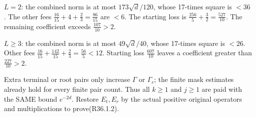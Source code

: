 \(L=2\): the combined norm is at most \(173\sqrt{d}/120\), whose 17-times square is \(<36\). The other fees \(\frac{16}{15}+4+\frac{2}{3}=\frac{86}{15}\) are \(<6\). The starting loss is \(\frac{256}{5}+\frac{3}{2}=\frac{527}{10}\). The remaining coefficient exceeds \(\frac{107}{10}>2\).

\(L\ge 3\): the combined norm is at most \(49\sqrt{d}/40\), whose 17-times square is \(<26\). Other fees \(\frac{16}{15}+\frac{142}{15}+\frac{2}{3}=\frac{56}{5}<12\). Starting loss \(\frac{607}{10}\) leaves a coefficient greater than \(\frac{227}{10}>2\).

Extra terminal or root pairs only increase \(\Gamma\) or \(\Gamma_r\); the finite mask estimates already hold for every finite pair count. Thus all \(k\ge 1\) and \(j\ge 1\) are paid with the SAME bound \(e^{-2d}\). Restore \(E_t,\allowbreak \allowbreak E_r\) by the actual positive original operators and multiplications to prove(R36.1.2).

